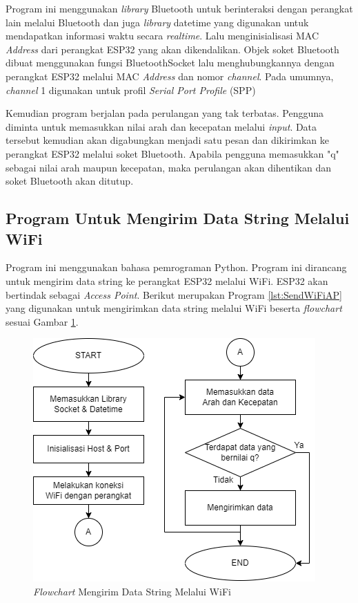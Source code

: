 Program ini menggunakan \emph{library} Bluetooth untuk berinteraksi dengan perangkat lain melalui Bluetooth dan juga \emph{library} datetime yang digunakan untuk mendapatkan informasi waktu secara \emph{realtime}. Lalu menginisialisasi MAC \emph{Address} dari perangkat ESP32 yang akan dikendalikan. Objek soket Bluetooth dibuat menggunakan fungsi BluetoothSocket lalu menghubungkannya dengan perangkat ESP32 melalui MAC \emph{Address} dan nomor \emph{channel}. Pada umumnya, \emph{channel} 1 digunakan untuk profil \emph{Serial Port Profile} (SPP)

Kemudian program berjalan pada perulangan yang tak terbatas. Pengguna diminta untuk memasukkan nilai arah dan kecepatan melalui \emph{input}. Data tersebut kemudian akan digabungkan menjadi satu pesan dan dikirimkan ke perangkat ESP32 melalui soket Bluetooth. Apabila pengguna memasukkan "q" sebagai nilai arah maupun kecepatan, maka perulangan akan dihentikan dan soket Bluetooth akan ditutup.

\subsection{Program Untuk Mengirim Data String Melalui WiFi}

Program ini menggunakan bahasa pemrograman Python. Program ini dirancang untuk mengirim data string ke perangkat ESP32 melalui WiFi. ESP32 akan bertindak sebagai \emph{Access Point}. Berikut merupakan Program \ref{lst:SendWiFiAP} yang digunakan untuk mengirimkan data string melalui WiFi beserta \emph{flowchart} sesuai Gambar \ref{fig:Flowchart 10 Mengirim String WiFi}.

\begin{figure} [ht] \centering
  \includegraphics[scale=0.7]{gambar/program/10. Mengirim Data String WiFi.png}
  \caption{\emph{Flowchart} Mengirim Data String Melalui WiFi}
  \label{fig:Flowchart 10 Mengirim String WiFi}
\end{figure}

